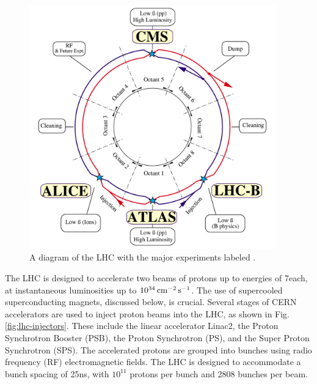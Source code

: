 \documentclass[12pt]{thesis}  %
\begin{document}
\begin{figure}[hbt]
\begin{center}
\includegraphics[width=0.95\textwidth]{figures/lhc-pho-1997-060.png}
\caption{A diagram of the LHC with the major experiments labeled \cite{Jean-Luc:841573}.}
\label{fig:lhc-diagram}
\end{center}
\end{figure}

The LHC is designed to accelerate two beams of protons up to energies of 7\TeV each, at instantaneous luminosities up to $10^{34}\,\text{cm}^\text{$-$2}\,\text{s}^\text{$-$1}$. The use of supercooled superconducting magnets, discussed below, is crucial. Several stages of CERN accelerators are used to inject proton beams into the LHC, as shown in Fig. \ref{fig:lhc-injectors}. These include the linear accelerator Linac2, the Proton Synchrotron Booster (PSB), the Proton Synchrotron (PS), and the Super Proton Synchrotron (SPS). The accelerated protons are grouped into bunches using radio frequency (RF) electromagnetic fields. The LHC is designed to accommodate a bunch spacing of 25\unit{ns}, with $10^{11}$ protons per bunch and 2808 bunches per beam.
\end{document}
